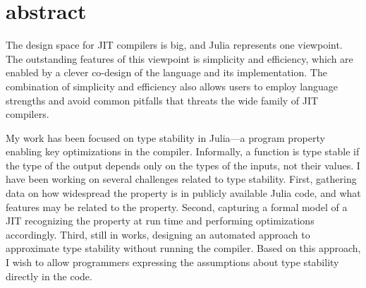 
\frenchspacing
\raggedbottom

\pagestyle{plain}



\chapter*{abstract}
The design space for JIT compilers is big, and Julia represents one viewpoint.
The outstanding features of this viewpoint is simplicity and efficiency, which
are enabled by a clever co-design of the language and its implementation.
The combination of simplicity and efficiency also allows users to employ
language strengths and avoid common pitfalls that threats the wide family of JIT
compilers.

My work has been focused on type stability in Julia---a program property
enabling key optimizations in the compiler.
Informally, a function is type stable if the type of
the output depends only on the types of the inputs, not their values.
I have been working on several
challenges related to type stability.
First, gathering data on how widespread the
property is in publicly available Julia code, and what features may be related
to the property.
Second, capturing a formal model of a JIT recognizing the
property at run time and performing optimizations accordingly. Third, still in
works, designing an automated approach to approximate type stability without
running the compiler. Based on this approach, I wish to allow programmers expressing
the assumptions about type stability directly in the code.

\pagestyle{scrheadings}
{}
\setcounter{tocdepth}{2} %
\setcounter{secnumdepth}{3} %
\tableofcontents

\cleardoublepage
\pagestyle{scrheadings}
\cleardoublepage
